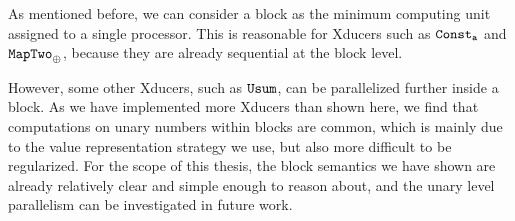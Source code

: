 %	
%	
%	
%	
%	
%	
%	
%	
%
%



As mentioned before, we can consider a block  as the minimum computing unit assigned to a single processor. This is reasonable for
Xducers such as $\mathtt{Const_{a}}$ and $\mathtt{MapTwo}_{\oplus}$, because
they are already sequential at the block level. 

However, some other Xducers, such as $\mathtt{Usum}$, can be parallelized further inside a block.
As we have implemented more Xducers than shown here, we find that computations on unary numbers within blocks are common, which is mainly due to the value representation strategy we use, but also more difficult to be regularized.
For the scope of this thesis, the block semantics we have shown are already relatively clear and simple enough to reason about, and the unary level parallelism can be investigated in future work. 



